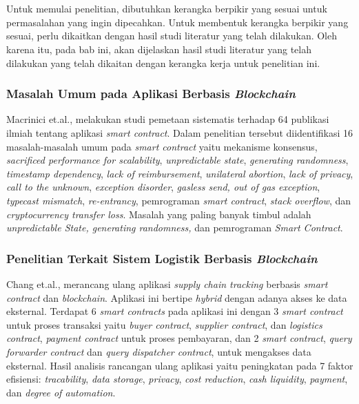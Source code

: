 \chapter{\babDua}
\label{bab:2}
Untuk memulai penelitian, dibutuhkan kerangka berpikir yang sesuai untuk permasalahan yang ingin dipecahkan. Untuk membentuk kerangka berpikir yang sesuai, perlu dikaitkan dengan hasil studi literatur yang telah dilakukan. Oleh karena itu, pada bab ini, akan dijelaskan hasil studi literatur yang telah dilakukan yang telah dikaitan dengan kerangka kerja untuk penelitian ini.

\subsection{Masalah Umum pada Aplikasi Berbasis \textit{Blockchain}}
\label{sec:masalahblockchain}

Macrinici et.al., \citep{Macrinici2018} melakukan studi pemetaan sistematis terhadap 64 publikasi ilmiah tentang aplikasi \textit{smart contract}. Dalam penelitian tersebut diidentifikasi 16 masalah-masalah umum pada \textit{smart contract} yaitu mekanisme konsensus, \textit{sacrificed performance for scalability}, \textit{unpredictable state}, \textit{generating randomness}, \textit{timestamp dependency}, \textit{lack of reimbursement}, \textit{unilateral abortion}, \textit{lack of privacy}, \textit{call to the unknown}, \textit{exception disorder}, \textit{gasless send, out of gas exception}, \textit{typecast mismatch}, \textit{re-entrancy}, pemrograman \textit{smart contract}, \textit{stack overflow}, dan \textit{cryptocurrency transfer loss}. Masalah yang paling banyak timbul adalah \textit{unpredictable State, generating randomness,} dan pemrograman \textit{Smart Contract}. 

\subsection{Penelitian Terkait Sistem Logistik Berbasis \textit{Blockchain}}
\label{sec:penelitianlain}

Chang et.al., \citep{Chang2019} merancang ulang aplikasi \textit{supply chain tracking} berbasis \textit{smart contract} dan \textit{blockchain}. Aplikasi ini bertipe \textit{hybrid} dengan adanya akses ke data eksternal. Terdapat 6 \textit{smart contracts} pada aplikasi ini dengan 3 \textit{smart contract} untuk proses transaksi yaitu \textit{buyer contract}, \textit{supplier contract}, dan \textit{logistics contract}, \textit{payment contract} untuk proses pembayaran, dan 2 \textit{smart contract}, \textit{query forwarder contract} dan \textit{query dispatcher contract}, untuk mengakses data eksternal. Hasil analisis rancangan ulang aplikasi yaitu peningkatan pada 7 faktor efisiensi: \textit{tracability}, \textit{data storage}, \textit{privacy}, \textit{cost reduction}, \textit{cash liquidity}, \textit{payment}, dan \textit{degree of automation}.



